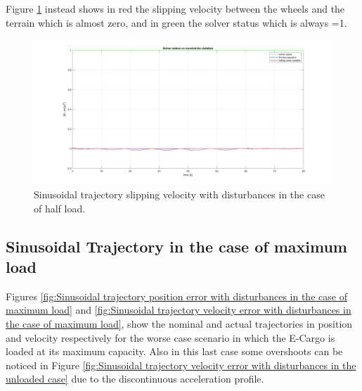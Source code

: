 Figure \ref{fig:Sinusoidal trajectory slipping velocity with disturbances in the case of half load} instead shows in red the slipping velocity between the wheels and the terrain which is almost zero, and in green the solver status which is always =1.

\begin{figure}
    \centering
    \includegraphics[width=1\linewidth]{Images/Robustness analysis/intermediate load/sinusoidal trajectory/Slipping_velocity.jpg}
    \caption{Sinusoidal trajectory slipping velocity with disturbances in the case of half load.}
    \label{fig:Sinusoidal trajectory slipping velocity with disturbances in the case of half load}
\end{figure}

\subsection{Sinusoidal Trajectory in the case of maximum load}
\label{subsec:Sinusoidal Trajectory in the case of maximum load}

Figures \ref{fig:Sinusoidal trajectory position error with disturbances in the case of maximum load} and \ref{fig:Sinusoidal trajectory velocity error with disturbances in the case of maximum load}, show the nominal and actual trajectories in position and velocity respectively for the worse case scenario in which the E-Cargo is loaded at its maximum capacity.
Also in this last case some overshoots can be noticed in Figure \ref{fig:Sinusoidal trajectory velocity error with disturbances in the unloaded case} due to the discontinuous acceleration profile.

